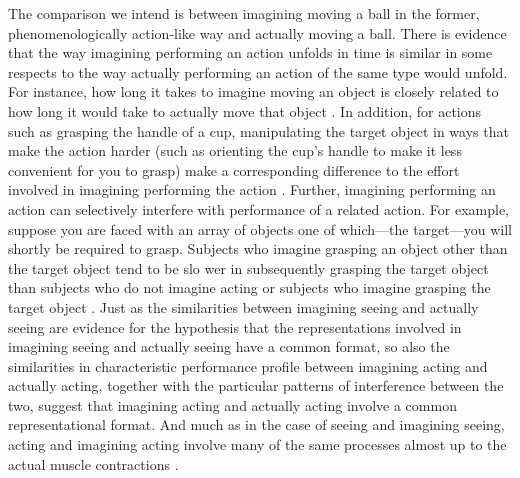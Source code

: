 \documentclass[12pt,\papersize]{extarticle}
\begin{document}
The comparison we intend is between imagining moving a ball in the former, phenomenologically action-like way and actually moving a ball. There is evidence that the way imagining performing an action unfolds in time is similar in some respects to the way actually performing an action of the same type would unfold.  For instance, how long it takes to imagine moving an object is closely related to how long it would take to actually move that object \citep{decety:1989_timing, decety:1996_imagined, Jeannerod:1994oz}. In addition, for actions such as grasping the handle of a cup, manipulating the target object in ways that make the action harder (such as orienting the cup's handle to make it less convenient for you to grasp) make a corresponding difference to the effort involved in imagining performing the action \citep{parsons:1994_temporal, frak:2001_orientation}. Further, imagining performing an action can selectively interfere with performance of a related action. For example, suppose you are faced with an array of objects one of which---the target---you will shortly be required to grasp.  Subjects who imagine grasping an object other than the target object tend to be slo wer in subsequently grasping the target object than subjects who do not imagine acting or subjects who imagine grasping the target object \citep{ramsey:2010_incongruent_}. Just as the similarities between imagining seeing and actually seeing are evidence for the hypothesis that the representations involved in imagining seeing and actually seeing have a common format, so also the similarities in characteristic performance profile between imagining acting and actually acting, together with the particular patterns of interference between the two, suggest that imagining acting and actually acting involve a common representational format. And much as in the case of seeing and imagining seeing, acting and imagining acting involve many of the same processes almost up to the actual muscle contractions \citep{jeannerod:1995_mental, jeannerod:2003_mechanism}.
\end{document}
